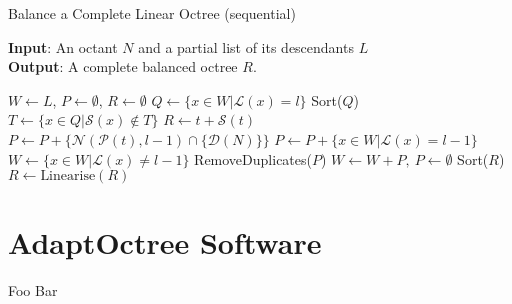 \documentclass[12pt, a4, twoside]{article}
\begin{document}
\begin{algorithm}
    \caption{Balance a Complete Linear Octree (sequential)}\label{alg:balance}
    \hspace*{\algorithmicindent} \textbf{Input}: An octant $N$ and a partial list of its descendants $L$ \\
    \hspace*{\algorithmicindent} \textbf{Output}: A complete balanced octree $R$.
    \begin{algorithmic}[1]
    \State $W \gets L$, $P \gets \emptyset$, $R \gets \emptyset$
            \State $Q \gets \{x \in W | \mathcal{L}(x)=l\}$
            \State Sort($Q$)
            \State $T \gets \{x \in Q | \mathcal{S}(x) \notin T\}$
               \State $R \gets t + \mathcal{S}(t)$
               \State $P \gets P + \{\mathcal{N}(\mathcal{P}(t), l-1) \cap \{\mathcal{D}(N)\}\}$
            \EndFor
            \State $P \gets P + \{x \in W | \mathcal{L}(x) = l-1\}$
            \State $W \gets \{x \in W | \mathcal{L}(x) \neq l-1\}$
            \State RemoveDuplicates($P$)
            \State $W \gets W + P, \> P \gets \emptyset$
        \EndFor
        \State Sort($R$)
        \State $R \gets \text{Linearise}(R)$ 
    \EndFunction
    \end{algorithmic}
 \end{algorithm}


\section*{AdaptOctree Software}

Foo Bar


\newpage
\printbibliography
\end{document}
